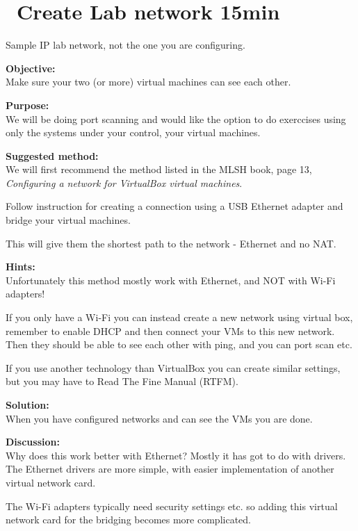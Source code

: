 \documentclass[a4paper,11pt,notitlepage]{report}
\begin{document}
\chapter{\faExclamationTriangle\ Create Lab network 15min}
\label{ex:virtualbox-network}

Sample IP lab network, not the one you are configuring.

{\bf Objective:}\\
Make sure your two (or more) virtual machines can see each other.


{\bf Purpose:}\\
We will be doing port scanning and would like the option to do exerccises using only the systems under your control, your virtual machines.

{\bf Suggested method:}\\
We will first recommend the method listed in the MLSH book, page 13, \emph{Configuring a network for VirtualBox virtual machines}.

Follow instruction for creating a connection using a USB Ethernet adapter and bridge your virtual machines.

This will give them the shortest path to the network - Ethernet and no NAT.

{\bf Hints:}\\
Unfortunately this method mostly work with Ethernet, and NOT with Wi-Fi adapters!

If you only have a Wi-Fi you can instead create a new network using virtual box, remember to enable DHCP and then connect your VMs to this new network. Then they should be able to see each other with ping, and you can port scan etc.

If you use another technology than VirtualBox you can create similar settings, but you may have to Read The Fine Manual (RTFM).


{\bf Solution:}\\
When you have configured networks and can see the VMs you are done.

{\bf Discussion:}\\
Why does this work better with Ethernet? Mostly it has got to do with drivers. The Ethernet drivers are more simple, with easier implementation of another virtual network card.

The Wi-Fi adapters typically need security settings etc. so adding this virtual network card for the bridging becomes more complicated.
\end{document}

